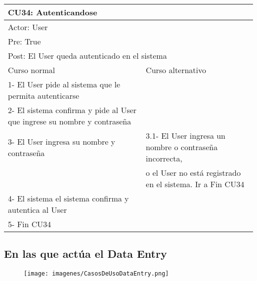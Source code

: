 \begin{table}[H]
  \begin{adjustbox}{max width = \textwidth}
  \begin{tabular}{|l|l|}
    \hline
    \multicolumn{2}{|l|}{CU34: Autenticandose} \\\hline
    \multicolumn{2}{|l|}{Actor: User} \\\hline
    \multicolumn{2}{|l|}{Pre: True} \\\hline
    \multicolumn{2}{|l|}{Post: El User queda autenticado en el sistema} \\\hline
     Curso normal & Curso alternativo\\ \hline
     1- El User pide al sistema que le permita autenticarse & \\ \hline
     2- El sistema confirma y pide al User que ingrese su nombre y contraseña & \\ \hline
     3- El User ingresa su nombre y contraseña & 3.1- El User ingresa un nombre o contraseña incorrecta, \\ & o el User no está registrado en el sistema. Ir a Fin CU34 \\ \hline
     4- El sistema el sistema confirma y autentica al User & \\ \hline
     5- Fin CU34 & \\ \hline
  \end{tabular}
  \end{adjustbox}
\end{table}

\subsection{En las que actúa el Data Entry}

\begin{figure}[H]
    \texttt{[image: imagenes/CasosDeUsoDataEntry.png]}
\end{figure}

